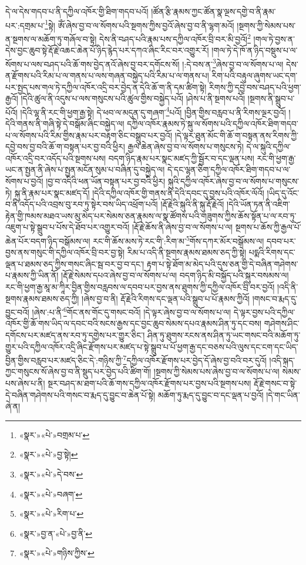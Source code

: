 དེ་ལ་དེས་གདབ་པ་ནི་དཀྱིལ་འཁོར་གྱི་ཐིག་གདབ་པའོ། །ཚོན་རྩི་རྣམས་ཀྱང་ཚོན་སྣ་ལྔས་དགྱེ་བ་ནི་རྣམ་པར་:དགྲམ་པ་\footnote{«སྣར་»«པེ་»བགྲམ་པ་}སྟེ། ཨོཾ་ཞེས་བྱ་བ་ལ་སོགས་པའི་སྔགས་ཀྱིས་བྱའོ་ཞེས་བྱ་བ་ནི་ལྷག་མའོ། །སྔགས་ཀྱི་སེམས་པས་ན་སྔགས་ལ་མཆོག་ཏུ་གཞོལ་བ་སྟེ། དེས་ནི་བཤད་པའི་རྣམ་པས་དཀྱིལ་འཁོར་བྲི་བར་མི་བྱའོ།\footnote{«སྣར་»«པེ་»བྱ་སྟེ།} །གལ་ཏེ་བྱས་ན་དེས་བྱང་ཆུབ་སྟེ་རྡོ་རྗེ་འཆང་ཆེན་པོ་ཉིད་རྙེད་པར་དཀའ་ཞིང་རིང་བར་འགྱུར་རོ། །གལ་ཏེ་དེ་ཁོ་ན་ཉིད་བསྡུས་པ་ལ་སོགས་པ་ལས་བཤད་པའི་ཆོ་གས་བྱེད་ནའོ་ཞེས་བྱ་བར་དགོངས་སོ། །:དེ་བས་ན་\footnote{«སྣར་»«པེ་»དེ་བས་}ཞེས་བྱ་བ་ལ་སོགས་པ་ལ། དེས་ན་རྫོགས་པའི་རིམ་པ་ལ་གནས་པ་ལས་གཞན་བསྐྱེད་པའི་རིམ་པ་ལ་གནས་པ། རིག་པའི་བརྟུལ་ཞུགས་ཡང་དག་པར་སྤྱད་པས་གལ་ཏེ་དཀྱིལ་འཁོར་འདྲི་བར་བྱེད་ན་དེའི་ཆོ་ག་ནི་དམ་ཚིག་སྟེ། རིགས་ཀྱི་དབྱེ་བས་བཤད་པའི་ཕྱག་རྒྱའོ། །དེའི་ཚུལ་ནི་འདུས་པ་ལས་གསུངས་པའི་ཚུལ་གྱིས་བསྐྱེད་པའོ། །ཤེས་པ་ནི་སྔགས་པའོ། །སྔགས་ནི་སྒྲུབ་པ་པོའོ། །དེའི་ལྷ་ནི་རང་གི་ཕྱག་རྒྱ་སྟེ། དེ་ཕབ་ལ་མདུན་དུ་གཞག་\footnote{«སྣར་»«པེ་»བཞག་}པའོ། །བྱིན་གྱིས་བརླབ་པ་ནི་རིགས་ལྔར་བྱའོ། །དེའི་གནས་ནི་གཞི་སྟེ་དེ་བསྒོམ་ཞིང་བསྐྱེད་ལ། དཀྱིལ་འཁོར་རྣམས་ཏེ་སྐུ་ལ་སོགས་པའི་དཀྱིལ་འཁོར་ཐིག་གདབ་པ་ལ་སོགས་པའི་རིམ་གྱིས་རྣམ་པར་བརྟག་ཅིང་བསྒྲུབ་པར་བྱའོ། །དེ་ལྟར་ཐུན་མོང་གི་ཆོ་ག་བསྟན་ནས་རིགས་ཀྱི་དབྱེ་བས་བྱ་བའི་ཆོ་ག་བསྟན་པར་བྱ་བའི་ཕྱིར། རྒྱལ་ཆེན་ཞེས་བྱ་བ་ལ་སོགས་པ་གསུངས་ཏེ། དེ་ལ་སྐུའི་དཀྱིལ་འཁོར་འདྲི་བར་འདོད་པའི་སྔགས་པས། བདག་ཉིད་རྣམ་པར་སྣང་མཛད་ཀྱི་སྦྱོར་བ་དང་ལྡན་པས། རང་གི་ཕྱག་རྒྱ་ཡང་ན་སྤྱན་ནི་ཞེས་པ་སྤྱན་མངོན་སུམ་པ་བཞིན་དུ་བསྐྱེད་ལ། དེ་དང་ལྷན་ཅིག་དཀྱིལ་འཁོར་ཐིག་གདབ་པ་ལ་སོགས་པ་བྱའོ། །བྱ་བ་འདིའི་ཕན་ཡོན་བསྟན་པར་བྱ་བའི་ཕྱིར། སྐུའི་དཀྱིལ་འཁོར་ཞེས་བྱ་བ་ལ་སོགས་པ་གསུངས་ཏེ། སྐུ་ནི་རྣམ་པར་སྣང་མཛད་དོ། །དེའི་དཀྱིལ་འཁོར་གྱི་གནས་ནི་དེའི་དབང་དུ་བྱས་པའི་འཁོར་ལོའོ། །ཡིད་དུ་འོང་བ་ནི་འདོད་པའི་འབྲས་བུ་རབ་ཏུ་སྟེར་བས་ཡིད་འཕྲོག་པའོ། །རྡོ་རྗེའི་སྐུའི་ནི་སྐུ་རྡོ་རྗེའོ། །དེའི་ཡོན་ཏན་ནི་འཇིག་རྟེན་གྱི་ཁམས་མཐའ་ཡས་མུ་མེད་པར་སེམས་ཅན་རྣམས་ལ་སྣ་ཚོགས་པའི་གཟུགས་ཀྱིས་ཆོས་སྟོན་པ་ལ་རབ་ཏུ་འཇུག་པ་སྟེ་སྒྲུབ་པ་པོས་དེ་ཐོབ་པར་འགྱུར་བའོ། །རྡོ་རྗེ་ཆོས་ནི་ཞེས་བྱ་བ་ལ་སོགས་པ་ལ། སྔགས་པ་ཆོས་ཀྱི་རྒྱལ་པོ་ཆེན་པོར་བདག་ཉིད་བསྒོམས་ལ། རང་གི་ཆོས་མས་ཏེ་རང་གི་:རིག་མ་\footnote{«སྣར་»«པེ་»རིག་པ་}གོས་དཀར་མོར་བསྒོམས་ལ། དབབ་པར་བྱས་ནས་གསུང་གི་དཀྱིལ་འཁོར་བྲི་བར་བྱ་སྟེ། རིམ་པ་འདི་ནི་སྔགས་རྣམས་ཐམས་ཅད་ཀྱི་སྟེ། པདྨའི་རིགས་དང་ལྡན་པ་ཐམས་ཅད་ཀྱིས་གསང་ཞིང་སྦ་བར་བྱ་བ་དང་། རྟག་པ་སྟེ་ཐོག་མ་མེད་པའི་དུས་ཅན་གྱི་དེ་བཞིན་གཤེགས་པ་རྣམས་ཀྱི་ཡིན་ནོ། །རྡོ་རྗེ་སེམས་དཔའ་ཞེས་བྱ་བ་ལ་སོགས་པ་ལ། བདག་ཉིད་མི་བསྐྱོད་པའི་སྐུར་བསམས་ལ། རང་གི་ཕྱག་རྒྱ་མཱ་མ་ཀཱིར་བྱིན་གྱིས་བརླབས་ལ་དབབ་པར་བྱས་ནས་ཐུགས་ཀྱི་དཀྱིལ་འཁོར་བྲི་བར་བྱའོ། །འདི་ནི་སྔགས་རྣམས་ཐམས་ཅད་ཀྱི། །ཞེས་བྱ་བ་ནི། རྡོ་རྗེའི་རིགས་དང་ལྡན་པའི་སྒྲུབ་པ་པོ་རྣམས་ཀྱིའོ། །གསང་བ་རྨད་དུ་བྱུང་བའོ། །ཞེས་:པ་ནི་\footnote{«སྣར་»བྱ་ན་«པེ་»བྱ་ནི་}གོང་ནས་གོང་དུ་གསང་བའོ། །དེ་ལྟར་ཞེས་བྱ་བ་ལ་སོགས་པ་ལ། དེ་ལྟར་བྱས་པའི་དཀྱིལ་འཁོར་གྱི་ཆོ་གས་ཡིད་ལ་དབང་བའི་སངས་རྒྱས་དང་བྱང་ཆུབ་སེམས་དཔའ་རྣམས་ཤིན་ཏུ་དང་བས། གཤེགས་ཤིང་དགོངས་པར་མཛད་ནས་རབ་ཏུ་དགྱེས་པར་གྱུར་ཅིང་། ཤིན་ཏུ་ཐུགས་རངས་ནས་ཤིན་ཏུ་ཡང་གསང་བའི་མཆོག་ཏུ་གྱུར་པའི་དཀྱིལ་འཁོར་འདྲི་ཞིང་རྫོགས་པར་མཛད་པ་སྟེ་སྒྲུབ་པ་པོ་ཕྱག་རྒྱ་དང་བཅས་པའི་ལུས་དང་ངག་དང་ཡིད་བྱིན་གྱིས་བརླབ་པར་མཛད་ཅིང་དེ་:གཉིས་ཀྱི་\footnote{«སྣར་»«པེ་»གཉིས་ཀྱིས་}དཀྱིལ་འཁོར་རྫོགས་པར་བྱེད་དོ་ཞེས་བྱ་བའི་བར་དུའོ། །འདི་སྐད་ཀྱང་གསུངས་སོ་ཞེས་བྱ་བ་ནི་སྡུད་པར་བྱེད་པའི་ཚིག་གོ། །སྔགས་ཀྱི་སེམས་པས་ཞེས་བྱ་བ་ལ་སོགས་པ་ལ། སེམས་པས་ཞེས་པ་ནི། སྔར་བཤད་མ་ཐག་པའི་ཆོ་གས་དཀྱིལ་འཁོར་རྫོགས་པར་བྱས་པའི་སྔགས་པས། རྡོ་རྗེ་གསང་བ་སྟེ་དེ་བཞིན་གཤེགས་པའི་གསང་བ་རྨད་དུ་བྱུང་བ་ཆེན་པོ་སྟེ། མཆོག་ཏུ་རྨད་དུ་བྱུང་བ་དང་ལྡན་པ་བྱའོ། །དེ་གང་ཡིན་ཞེ་ན། 